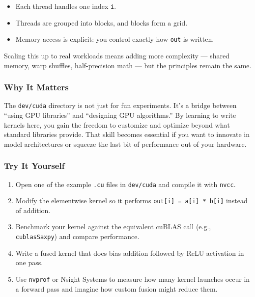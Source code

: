 \documentclass[
  letterpaper,
  DIV=11,
  numbers=noendperiod]{scrreprt}
\providecommand{\tightlist}{%
  \setlength{\itemsep}{0pt}\setlength{\parskip}{0pt}}
\begin{document}
\begin{itemize}
\tightlist
\item
  Each thread handles one index \texttt{i}.
\item
  Threads are grouped into blocks, and blocks form a grid.
\item
  Memory access is explicit: you control exactly how \texttt{out} is
  written.
\end{itemize}

Scaling this up to real workloads means adding more complexity ---
shared memory, warp shuffles, half-precision math --- but the principles
remain the same.

\subsubsection{Why It Matters}\label{why-it-matters-55}

The \texttt{dev/cuda} directory is not just for fun experiments. It's a
bridge between ``using GPU libraries'' and ``designing GPU algorithms.''
By learning to write kernels here, you gain the freedom to customize and
optimize beyond what standard libraries provide. That skill becomes
essential if you want to innovate in model architectures or squeeze the
last bit of performance out of your hardware.

\subsubsection{Try It Yourself}\label{try-it-yourself-69}

\begin{enumerate}
\def\labelenumi{\arabic{enumi}.}
\tightlist
\item
  Open one of the example \texttt{.cu} files in \texttt{dev/cuda} and
  compile it with \texttt{nvcc}.
\item
  Modify the elementwise kernel so it performs
  \texttt{out{[}i{]}\ =\ a{[}i{]}\ *\ b{[}i{]}} instead of addition.
\item
  Benchmark your kernel against the equivalent cuBLAS call (e.g.,
  \texttt{cublasSaxpy}) and compare performance.
\item
  Write a fused kernel that does bias addition followed by ReLU
  activation in one pass.
\item
  Use \texttt{nvprof} or Nsight Systems to measure how many kernel
  launches occur in a forward pass and imagine how custom fusion might
  reduce them.
\end{enumerate}
\end{document}
